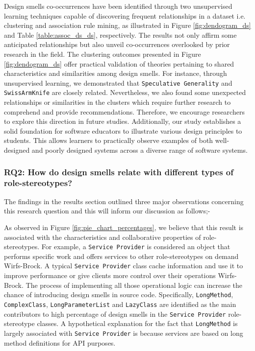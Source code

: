 \documentclass[AMA,Times1COL]{WileyNJDv5} %
\begin{document}
	Design smells co-occurrences have been identified through two unsupervised learning techniques capable of discovering frequent relationships in a dataset i.e. clustering and association rule mining, as illustrated in Figure \ref{fig:dendogram_ds} and Table \ref{table:assoc_ds_ds}, respectively. The results not only affirm some anticipated relationships but also unveil co-occurrences overlooked by prior research in the field. The clustering outcomes presented in Figure \ref{fig:dendogram_ds} offer practical validation of theories pertaining to shared characteristics and similarities among design smells. For instance, through unsupervised learning, we demonstrated that {\tt Speculative Generality} and {\tt SwissArmKnife} are closely related. Nevertheless, we also found some unexpected relationships or similarities in the clusters which require further research to comprehend and provide recommendations. Therefore, we encourage researchers to explore this direction in future studies. Additionally, our study establishes a solid foundation for software educators to illustrate various design principles to students. This allows learners to practically observe examples of both well-designed and poorly designed systems across a diverse range of software systems.
	
	\subsubsection*{RQ2: How do design smells relate with different types of role-stereotypes?}
	The findings in the results section outlined three major observations concerning this research question and this will inform our discussion as follows;- 
	
	As observed in Figure \ref{fig:pie_chart_percentages}, we believe that this result is associated with the characteristics and collaborative properties of role-stereotypes. For example, a {\tt Service Provider} is considered an object that performs specific work and offers services to other role-stereotypes on demand Wirfs-Brock\cite{wirfs2006characterizing}. A typical {\tt Service Provider} class cache information and use it to improve performance or give clients more control over their operations Wirfs-Brock\cite{wirfs2006characterizing}. The process of implementing all those operational logic can increase the chance of introducing design smells in source code. Specifically, {\tt LongMethod}, {\tt ComplexClass}, {\tt LongParameterList} and {\tt LazyClass} are identified as the main contributors to high percentage of design smells in the {\tt Service Provider} role-stereotype classes. A hypothetical explanation for the fact that {\tt LongMethod} is largely associated with {\tt Service Provider} is because services are based on long method definitions for API purposes.
	
\end{document}
